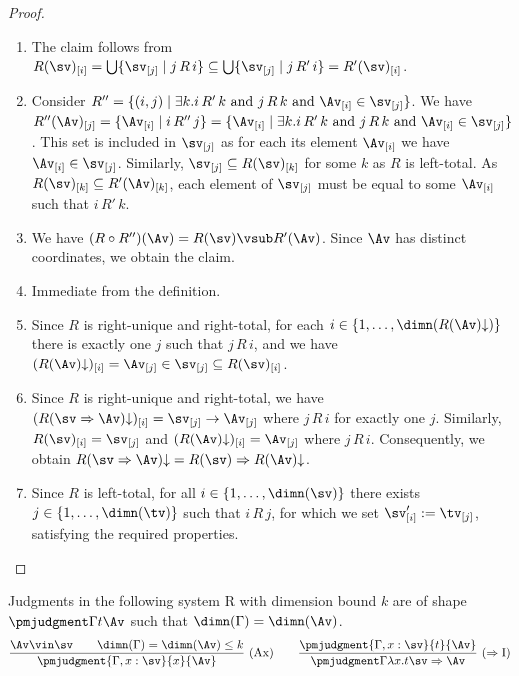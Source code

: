 \begin{proof}
\begin{enumerate}
\item The claim follows from $R(\sv)_{[i]}=\bigcup\{\sv_{[j]}\mid j\,R\,i\}\subseteq\bigcup\{\sv_{[j]}\mid j\,R'\,i\}=R'(\sv)_{[i]}$.
\item Consider $R''=\{(i,j)\mid\exists k.i\,R'\,k\text{ and }j\,R\,k\text{ and }\Av_{[i]}\in\sv_{[j]}\}$. We have $R''(\Av)_{[j]}=\{\Av_{[i]}\mid i\,R''\,j\}=\{\Av_{[i]}\mid\exists k.i\,R'\,k\text{ and }j\,R\,k\text{ and }\Av_{[i]}\in\sv_{[j]}\}$. This set is included in $\sv_{[j]}$ as for each its element $\Av_{[i]}$ we have $\Av_{[i]}\in\sv_{[j]}$. Similarly, $\sv_{[j]}\subseteq R(\sv)_{[k]}$ for some $k$ as $R$ is left-total. As $R(\sv)_{[k]}\subseteq R'(\Av)_{[k]}$, each element of $\sv_{[j]}$ must be equal to some $\Av_{[i]}$ such that $i\,R'\,k$.
\item We have $(R\circ R'')(\Av)=R(\sv)\vsub R'(\Av)$. Since $\Av$ has distinct coordinates, we obtain the claim.
\item Immediate from the definition.
\item Since $R$ is right-unique and right-total, for each $i\in\{1,\ldots,\dimn(R(\Av)\mathord\downarrow)\}$ there is exactly one $j$ such that $j\,R\,i$, and we have $(R(\Av)\mathord\downarrow)_{[i]}=\Av_{[j]}\in\sv_{[j]}\subseteq R(\sv)_{[i]}$.
\item Since $R$ is right-unique and right-total, we have $(R(\sv\Rightarrow\Av)\mathord\downarrow)_{[i]}=\sv_{[j]}\to\Av_{[j]}$ where $j\,R\,i$ for exactly one $j$. Similarly, $R(\sv)_{[i]}=\sv_{[j]}$ and $(R(\Av)\mathord\downarrow)_{[i]}=\Av_{[j]}$ where $j\,R\,i$. Consequently, we obtain $R(\sv\Rightarrow\Av)\mathord\downarrow=R(\sv)\Rightarrow R(\Av)\mathord\downarrow$.
\item Since $R$ is left-total, for all $i\in\{1,\ldots,\dimn(\sv)\}$ there exists $j\in\{1,\ldots,\dimn(\tv)\}$ such that $i\,R\,j$, for which we set $\sv'_{[i]}:=\tv_{[j]}$, satisfying the required properties.
\end{enumerate}
\end{proof}
Judgments in the following system R with dimension bound $k$ are of shape $\pmjudgment\Gamma t\Av$ such that $\dimn(\Gamma)=\dimn(\Av)$.
\[\frac{\Av\vin\sv\qquad\dimn(\Gamma)=\dimn(\Av)\leq k}{\pmjudgment{\Gamma,x:\sv}{x}{\Av}}\ (\mathrm{Ax})\qquad
\frac{\pmjudgment{\Gamma,x:\sv}{t}{\Av}}{\pmjudgment\Gamma{\lambda x.t}{\sv\Rightarrow\Av}}\ (\Rightarrow\mathrm I)\]
